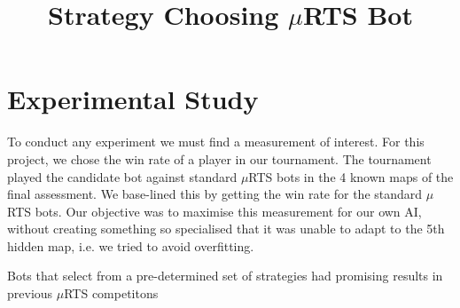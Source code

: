 \documentclass[]{article}
\title{Strategy Choosing $\mu$RTS Bot}
\author{}
\begin{document}
\maketitle

\begin{abstract}

\end{abstract}

\section{Experimental Study}
To conduct any experiment we must find a measurement of interest. For this project, we chose the win rate of a player in our tournament. The tournament played the candidate bot against standard $\mu$RTS bots in the 4 known maps of the final assessment. We base-lined this by getting the win rate for the standard $\mu$RTS bots. Our objective was to maximise this measurement for our own AI, without creating something so specialised that it was unable to adapt to the 5th hidden map, i.e. we tried to avoid overfitting. 

Bots that select from a pre-determined set of strategies had promising results in previous $\mu$RTS competitons 

\begin{thebibliography}{9}
	

\end{thebibliography}
\end{document}
